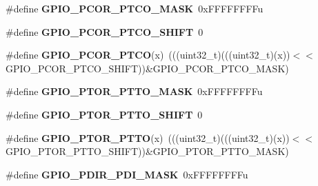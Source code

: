 \begin{DoxyCompactItemize}
\item 
\mbox{\label{group___g_p_i_o___register___masks_ga0b8378768ee61ea2c685a1687c90fa03}} 
\#define {\bfseries G\+P\+I\+O\+\_\+\+P\+C\+O\+R\+\_\+\+P\+T\+C\+O\+\_\+\+M\+A\+SK}~0x\+F\+F\+F\+F\+F\+F\+F\+Fu
\item 
\mbox{\label{group___g_p_i_o___register___masks_ga5c9203b830cbd86cd8d0189872b5c772}} 
\#define {\bfseries G\+P\+I\+O\+\_\+\+P\+C\+O\+R\+\_\+\+P\+T\+C\+O\+\_\+\+S\+H\+I\+FT}~0
\item 
\mbox{\label{group___g_p_i_o___register___masks_ga3a9c3710923cd50fc2df4e678180eb1d}} 
\#define {\bfseries G\+P\+I\+O\+\_\+\+P\+C\+O\+R\+\_\+\+P\+T\+CO}(x)~(((uint32\+\_\+t)(((uint32\+\_\+t)(x))$<$$<$G\+P\+I\+O\+\_\+\+P\+C\+O\+R\+\_\+\+P\+T\+C\+O\+\_\+\+S\+H\+I\+FT))\&G\+P\+I\+O\+\_\+\+P\+C\+O\+R\+\_\+\+P\+T\+C\+O\+\_\+\+M\+A\+SK)
\item 
\mbox{\label{group___g_p_i_o___register___masks_gaa75953b5d9d23bdaa6c24232e1a52680}} 
\#define {\bfseries G\+P\+I\+O\+\_\+\+P\+T\+O\+R\+\_\+\+P\+T\+T\+O\+\_\+\+M\+A\+SK}~0x\+F\+F\+F\+F\+F\+F\+F\+Fu
\item 
\mbox{\label{group___g_p_i_o___register___masks_ga70e5442b3a119665aafb9e6e5b48bbd5}} 
\#define {\bfseries G\+P\+I\+O\+\_\+\+P\+T\+O\+R\+\_\+\+P\+T\+T\+O\+\_\+\+S\+H\+I\+FT}~0
\item 
\mbox{\label{group___g_p_i_o___register___masks_ga40757476c8889ca9d4cb7017b6c5ab60}} 
\#define {\bfseries G\+P\+I\+O\+\_\+\+P\+T\+O\+R\+\_\+\+P\+T\+TO}(x)~(((uint32\+\_\+t)(((uint32\+\_\+t)(x))$<$$<$G\+P\+I\+O\+\_\+\+P\+T\+O\+R\+\_\+\+P\+T\+T\+O\+\_\+\+S\+H\+I\+FT))\&G\+P\+I\+O\+\_\+\+P\+T\+O\+R\+\_\+\+P\+T\+T\+O\+\_\+\+M\+A\+SK)
\item 
\mbox{\label{group___g_p_i_o___register___masks_gacb7c8cc976937906c8e803811a7fbb68}} 
\#define {\bfseries G\+P\+I\+O\+\_\+\+P\+D\+I\+R\+\_\+\+P\+D\+I\+\_\+\+M\+A\+SK}~0x\+F\+F\+F\+F\+F\+F\+F\+Fu
\item 
\mbox{\label{group___g_p_i_o___register___masks_ga99fd9212dd769bb1964a28a864c6c741}} 

\end{DoxyCompactItemize}
